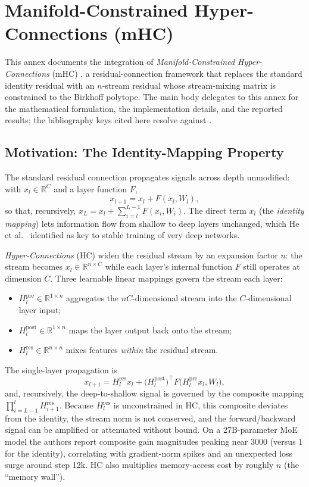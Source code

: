 \section{Manifold-Constrained Hyper-Connections (mHC)}
\label{sec:annex-mhc}

This annex documents the integration of \emph{Manifold-Constrained
Hyper-Connections} (mHC) \citep{xie_mhc_2025}, a residual-connection framework
that replaces the standard identity residual with an $n$-stream residual whose
stream-mixing matrix is constrained to the Birkhoff polytope. The main body
delegates to this annex for the mathematical formulation, the implementation
details, and the reported results; the bibliography keys cited here resolve
against .

\subsection{Motivation: The Identity-Mapping Property}

The standard residual connection \citep{he_deep_2016} propagates signals across
depth unmodified: with $x_l \in \mathbb{R}^{C}$ and a layer function $F$,
\[
x_{l+1} = x_l + F(x_l, W_l),
\]
so that, recursively, $x_L = x_l + \sum_{i=l}^{L-1} F(x_i, W_i)$. The direct
term $x_l$ (the \emph{identity mapping}) lets information flow from shallow to
deep layers unchanged, which He et al.~\citep{he_deep_2016} identified as key
to stable training of very deep networks.

\emph{Hyper-Connections} (HC) \citep{xie_mhc_2025} widen the residual stream by
an expansion factor $n$: the stream becomes $x_l \in \mathbb{R}^{n \times C}$
while each layer's internal function $F$ still operates at dimension $C$. Three
learnable linear mappings govern the stream each layer:
\begin{itemize}[leftmargin=*]
    \item $H^{\text{pre}}_l \in \mathbb{R}^{1 \times n}$ aggregates the
        $nC$-dimensional stream into the $C$-dimensional layer input;
    \item $H^{\text{post}}_l \in \mathbb{R}^{1 \times n}$ maps the layer output
        back onto the stream;
    \item $H^{\text{res}}_l \in \mathbb{R}^{n \times n}$ mixes features
        \emph{within} the residual stream.
\end{itemize}
The single-layer propagation is
\[
x_{l+1} = H^{\text{res}}_l x_l + \big(H^{\text{post}}_l\big)^{\!\top}
F\big(H^{\text{pre}}_l x_l, W_l\big),
\]
and, recursively, the deep-to-shallow signal is governed by the composite
mapping $\prod_{i=L-1}^{l} H^{\text{res}}_{i+1}$. Because $H^{\text{res}}_l$ is
unconstrained in HC, this composite deviates from the identity, the stream
norm is not conserved, and the forward/backward signal can be amplified or
attenuated without bound. On a 27B-parameter MoE model the authors report
composite gain magnitudes peaking near $3000$ (versus $1$ for the identity),
correlating with gradient-norm spikes and an unexpected loss surge around step
12k. HC also multiplies memory-access cost by roughly $n$ (the ``memory
wall'').


